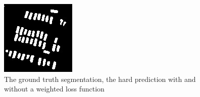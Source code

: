\documentclass[aspectratio=1610]{beamer}
\begin{document}
\begin{frame}
\begin{figure}[H]
\endminipage\hfill
{}%
  \includegraphics[width=\linewidth]{class_vs_w/weight_1}
\endminipage
\caption{The ground truth segmentation, the hard prediction with and without a weighted loss function}
\end{figure}
\end{frame}
\end{document}
